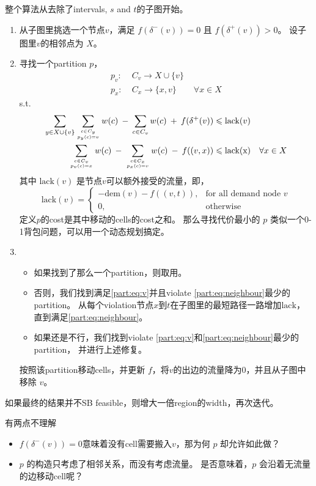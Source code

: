 \documentclass[UTF8,a4paper]{ctexart}
\renewcommand{\leq}{\leqslant}
\newcommand{\dem}[1]{\text{dem} ({#1})}
\renewcommand{\atop}[2]{\genfrac{}{}{0pt}{}{#1}{#2}}
\newcommand{\lack}{\text{lack}}
\begin{document}
整个算法从去除了intervals, $s$ and $t$的子图开始。
\begin{enumerate}
\item 从子图里挑选一个节点$v$，满足 $f(\delta^-(v))=0$ 且 $f(\delta^+(v))>0$。
    设子图里$v$的相邻点为 $X$。
\item 寻找一个partition $p$，
    \begin{align*}
        p_v:\;&C_v\to X\cup\{v\}\\
        p_{x}:\;& C_{x}\to \{x,v\}\qquad\forall x\in X
    \end{align*}
    s.t.
    \begin{align}
        \sum_{y\in X\cup\{v\}}\sum_{\atop{c\in C_y}{p_y(c)=v}}w(c)
        \:-\:
        \sum_{c\in C_v}w(c)
        \:+\:
        f(\delta^+(v))
        &\leq\lack(v)
        \label{part:eq:v}
        \\
        \sum_{\atop{c\in C_v}{p_v(c)=x}}w(c)
        \:-\:
        \sum_{\atop{c\in C_x}{p_x(c)=v}}w(c)
        \:-\:
        f((v,x))
        &\leq\text{lack(x)}\quad\forall x\in X
        \label{part:eq:neighbour}
    \end{align}
    其中 $\lack(v)$ 是节点$v$可以额外接受的流量，即，
    \[
        \lack(v)=\begin{cases}
            -\dem{v}-f((v,t)),
            &\text{for all demand node }v
            \\
            0,
            &\text{otherwise}
        \end{cases}
    \]
    定义$p$的cost是其中移动的cells的cost之和。
    那么寻找代价最小的 $p$ 类似一个0-1背包问题，可以用一个动态规划搞定。
\item ~
    \begin{itemize}
    \item 如果找到了那么一个partition，则取用。
    \item 否则，我们找到满足\ref{part:eq:v}并且violate \ref{part:eq:neighbour}最少的partition。
        从每个violation节点$x$到$t$在子图里的最短路径一路增加$\lack$，直到满足\ref{part:eq:neighbour}。
    \item 如果还是不行，我们找到violate \ref{part:eq:v}和\ref{part:eq:neighbour}最少的partition，
        并进行上述修复。
    \end{itemize}
    按照该partition移动cells，并更新 $f$，将$v$的出边的流量降为0，并且从子图中移除 $v$。
\end{enumerate}
如果最终的结果并不SB feasible，则增大一倍region的width，再次迭代。

\begin{noteblock}
    有两点不理解
    \begin{itemize}
    \item $f(\delta^-(v))=0$意味着没有cell需要搬入$v$，那为何 $p$ 却允许如此做？
    \item $p$ 的构造只考虑了相邻关系，而没有考虑流量。
        是否意味着，$p$ 会沿着无流量的边移动cell呢？
    \end{itemize}
\end{noteblock}
\end{document}
